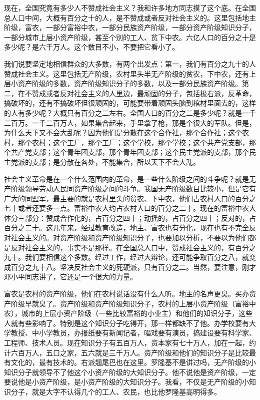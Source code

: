 现在，全国究竟有多少人不赞成社会主义？我和许多地方同志摸了这个底。在全国总人口中间，大概有百分之十的人，是不赞成或者反对社会主义的。这里包括地主阶级，富农，一部分富裕中农，一部分民族资产阶级，一部分资产阶级知识分子，一部分城市上层小资产阶级，甚至个别的工人、贫下中农。六亿人口的百分之十是多少呢？是六千万人。这个数目不小，不要把它看小了。

我们说要坚定地相信群众的大多数，有两个出发点：第一，我们有百分之九十的人赞成社会主义。这里包括无产阶级，农村里头半无产阶级的贫农，下中农，还有上层小资产阶级的多数，资产阶级知识分子的多数，以及一部分民族资产阶级。第二，在不赞成或者反对社会主义的人里边，最顽固的分子，包括极右派，反革命，搞破坏的，还有不搞破坏但很顽固的，可能要带着顽固头脑到棺材里面去的，这样的人有多少呢？大概只有百分之二左右。全国人口的百分之二是多少呢？就是一千二百万。一千二百万人，如果集合起来，手里拿了枪，那是个很大的军队。但是，为什么天下又不会大乱呢？因为他们是分散在这个合作社，那个合作社；这个农村，那个农村；这个工厂，那个工厂；这个学校，那个学校；这个共产党支部，那个共产党支部；这个青年团支部，那个青年团支部；这个民主党派的支部，那个民主党派的支部；是分散在各处，不能集合，所以天下不会大乱。

社会主义革命是在一个什么范围内的革命，是一些什么阶级之间的斗争呢？就是无产阶级领导劳动人民同资产阶级之间的斗争。我国无产阶级数目比较小，但是它有广大的同盟军，最主要的就是农村里头的贫农、下中农，他们占农村人口的百分之七十或者还要多一点。富裕中农大约占农村人口的百分之二十。现在的富裕中农大体分三部分：赞成合作化的，占百分之四十；动摇的，占百分之四十；反对的，占百分之二十。这几年来，经过教育改造，地主、富农也有分化，现在也有不完全反对社会主义的。对资产阶级和资产阶级知识分子，也要加以分析，不要以为他们都是反对社会主义的，事实不是那样。在全国总人口中，赞成社会主义的，有百分之九十。我们要相信这个多数。经过工作，经过大辩论，还可能争取百分之八，就变成百分之九十八。坚决反社会主义的死硬派，只有百分之二。当然，要注意，刚才邓小平同志讲了，它还是一个很大的力量。

富农是农村的资产阶级，他们在农村说话没有什么人听。地主的名声更臭。买办资产阶级早就臭了。资产阶级和资产阶级知识分子，农村的上层小资产阶级（富裕中农），城市的上层小资产阶级（一些比较富裕的小业主）和他们的知识分子，这些人就有些影响了。特别是这个知识分子吃得开，那一样都缺不了他。办学校要有大学教授、中小学教员，办报纸要有新闻记者，唱戏要有演员，搞建设要有科学家、工程师、技术人员。现在知识分子有五百万人，资本家有七十万人，加在一起，约计六百万人，五口之家，五六就是三千万人。资产阶级和他们的知识分子是比较最有文化的，最有技术的。右派翘尾巴也在这里。罗隆基不是讲过吗，无产阶级的小知识分子就领导不了他这个小资产阶级的大知识分子。他不说他是资产阶级，一定要说他是小资产阶级，是小资产阶级的大知识分子。我看，不仅是无产阶级的小知识分子，就是大字不认得几个的工人、农民，也比他罗隆基高明得多。

